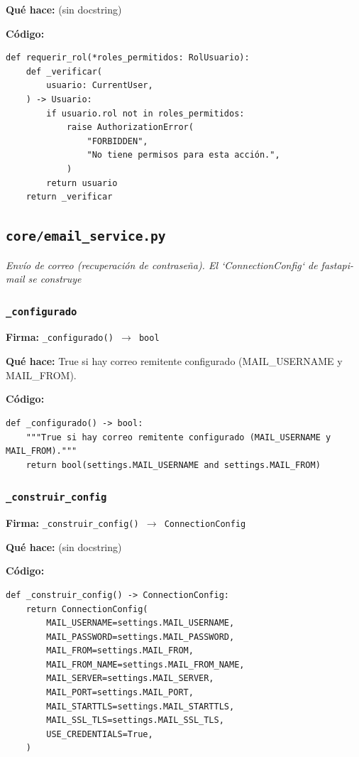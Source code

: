 \documentclass[11pt,a4paper]{article}
\begin{document}
\textbf{Qué hace:} (sin docstring)

\textbf{Código:}
\begin{lstlisting}
def requerir_rol(*roles_permitidos: RolUsuario):
    def _verificar(
        usuario: CurrentUser,
    ) -> Usuario:
        if usuario.rol not in roles_permitidos:
            raise AuthorizationError(
                "FORBIDDEN",
                "No tiene permisos para esta acción.",
            )
        return usuario
    return _verificar
\end{lstlisting}

\subsection{\texttt{core/email\_service.py}}
\textit{Envío de correo (recuperación de contraseña). El `ConnectionConfig` de fastapi-mail se construye}

\subsubsection*{\texttt{\_configurado}}
\textbf{Firma:} \texttt{\_configurado() $\rightarrow$ bool}

\textbf{Qué hace:} True si hay correo remitente configurado (MAIL\_USERNAME y MAIL\_FROM).

\textbf{Código:}
\begin{lstlisting}
def _configurado() -> bool:
    """True si hay correo remitente configurado (MAIL_USERNAME y MAIL_FROM)."""
    return bool(settings.MAIL_USERNAME and settings.MAIL_FROM)
\end{lstlisting}

\subsubsection*{\texttt{\_construir\_config}}
\textbf{Firma:} \texttt{\_construir\_config() $\rightarrow$ ConnectionConfig}

\textbf{Qué hace:} (sin docstring)

\textbf{Código:}
\begin{lstlisting}
def _construir_config() -> ConnectionConfig:
    return ConnectionConfig(
        MAIL_USERNAME=settings.MAIL_USERNAME,
        MAIL_PASSWORD=settings.MAIL_PASSWORD,
        MAIL_FROM=settings.MAIL_FROM,
        MAIL_FROM_NAME=settings.MAIL_FROM_NAME,
        MAIL_SERVER=settings.MAIL_SERVER,
        MAIL_PORT=settings.MAIL_PORT,
        MAIL_STARTTLS=settings.MAIL_STARTTLS,
        MAIL_SSL_TLS=settings.MAIL_SSL_TLS,
        USE_CREDENTIALS=True,
    )
\end{lstlisting}
\end{document}
